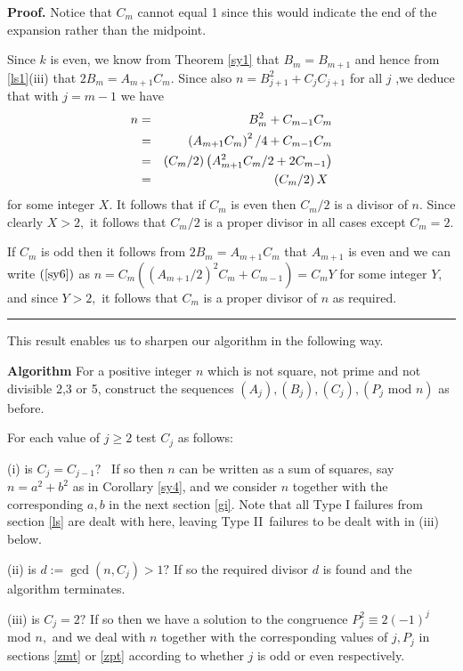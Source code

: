 \documentclass[12pt]{article}
\newenvironment{proof}[1][Proof]{\textbf{#1.} }{\ \rule{0.5em}{0.5em}}
\begin{document}
\begin{proof}
Notice that $C_{m}$ cannot equal 1 since this would indicate the end of the
expansion rather than the midpoint.

Since $k$ is even, we know from Theorem \ref{sy1} that $B_{m}=B_{m+1}$ and
hence from \ref{ls1}(iii) that $2B_{m}=A_{m+1}C_{m}.$ Since also $%
n=B_{j+1}^{2}+C_{j}C_{j+1}$ for all $j$ ,we deduce that with $j=m-1$ we have 
\begin{eqnarray}
n &=&B_{m}^{2}+C_{m-1}C_{m}  \notag \\
&=&\left( A_{m+1}C_{m}\right) ^{2}/4+C_{m-1}C_{m}  \label{sy6} \\
&=&\left( C_{m}/2\right) \left( A_{m+1}^{2}C_{m}/2+2C_{m-1}\right)  \notag \\
&=&\left( C_{m}/2\right) X\text{ }  \notag
\end{eqnarray}%
for some integer $X.$ It follows that if $C_{m}$ is even then $C_{m}/2$ is a
divisor of $n.$ Since clearly $X>2,$ it follows that $C_{m}/2$ is a proper
divisor in all cases except $C_{m}=2.$

If $C_{m}$ is odd then it follows from $2B_{m}=A_{m+1}C_{m}$ that $A_{m+1}$
is even and we can write $\left( \ref{sy6}\right) $ as $n=C_{m}\left( \left(
A_{m+1}/2\right) ^{2}C_{m}+C_{m-1}\right) =C_{m}Y$ for some integer $Y,$ and
since $Y>2,$ it follows that $C_{m}$ is a proper divisor of $n$ as required.
\end{proof}

This result enables us to sharpen our algorithm in the following way.

\textbf{Algorithm} For a positive integer $n$ which is not square, not prime
and not divisible 2,3 or 5, construct the sequences $\left( A_{j}\right)
,\left( B_{j}\right) ,\left( C_{j}\right) ,\left( P_{j}\text{ mod }n\right) $
as before.

For each value of $j\geq 2$ test $C_{j}$ as follows:

\qquad (i) is $C_{j}=C_{j-1}?$ \ If so then $n$ can be written as a sum of
squares, say $n=a^{2}+b^{2}$ as in Corollary \ref{sy4}, and we consider $n$
together with the corresponding $a,b$ in the next section \ref{gi}. Note
that all Type I failures from section \ref{ls} are dealt with here, leaving
Type II\ failures to be dealt with in (iii) below.

\qquad (ii) is $d:=\gcd \left( n,C_{j}\right) >1?$ If so the required
divisor $d$ is found and the algorithm terminates.

\qquad (iii) is $C_{j}=2?$ If so then we have a solution to the congruence $%
P_{j}^{2}\equiv 2(-1)^{j}$ mod $n,$ and we deal with $n$ together with the
corresponding values of $j,P_{j}$ in sections \ref{zmt} or \ref{zpt}
according to whether $j$ is odd or even respectively.
\end{document}
